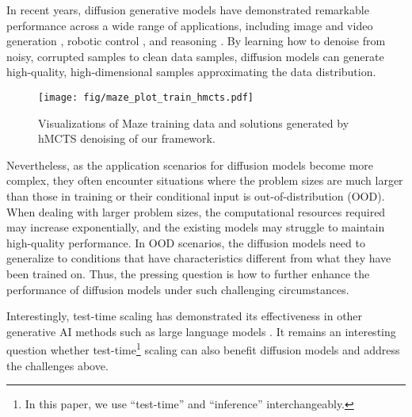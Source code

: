 In recent years, diffusion generative models \cite{sohl2015deep,ho2020denoising,song2021scorebased} have demonstrated remarkable performance across a wide range of applications, including image \cite{stablediffusion} and video generation \cite{sora}, robotic control \cite{diffuser}, and reasoning \cite{du2024learning}. By learning how to denoise from noisy, corrupted samples to clean data samples, diffusion models can generate high-quality, high-dimensional samples approximating the data distribution.
\begin{figure}[ht]
\label{fig:maze_train_hmcts}
\begin{center}
\centerline{\texttt{[image: fig/maze\_plot\_train\_hmcts.pdf]}}
\caption{Visualizations of Maze training data and solutions generated by hMCTS denoising of our \proj framework.}
\end{center}
\vskip -0.45in
\end{figure}

Nevertheless, as the application scenarios for diffusion models become more complex, they often encounter situations where the problem sizes are much larger than those in training or their conditional input is out-of-distribution (OOD). When dealing with larger problem sizes, the computational resources required may increase exponentially, and the existing models may struggle to maintain high-quality performance. In OOD scenarios, the diffusion models need to generalize to conditions that have characteristics different from what they have been trained on. Thus, the pressing question is how to further enhance the performance of diffusion models under such challenging circumstances.

Interestingly, test-time scaling has demonstrated its effectiveness in other generative AI methods such as large language models \cite{wei2022chain,yao2024tree}.
It remains an interesting question whether test-time\footnote{In this paper, we use ``test-time'' and ``inference'' interchangeably.} scaling can also benefit diffusion models and address the challenges above.

